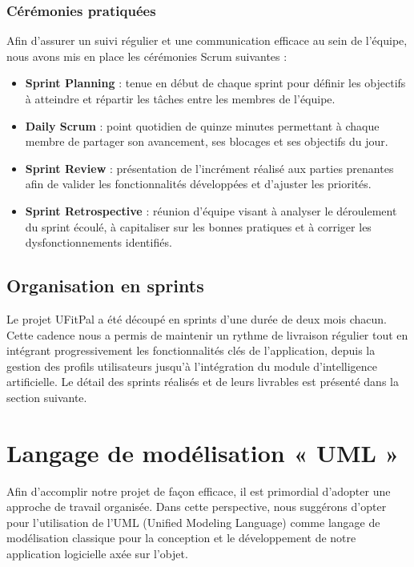 \documentclass[a4paper,12pt]{report}
\begin{document}
\subsubsection{Cérémonies pratiquées}
Afin d'assurer un suivi régulier et une communication efficace au sein de l'équipe, nous 
avons mis en place les cérémonies Scrum suivantes :
\begin{itemize}
    \item \textbf{Sprint Planning} : tenue en début de chaque sprint pour définir les 
    objectifs à atteindre et répartir les tâches entre les membres de l'équipe.
    \item \textbf{Daily Scrum} : point quotidien de quinze minutes permettant à chaque 
    membre de partager son avancement, ses blocages et ses objectifs du jour.
    \item \textbf{Sprint Review} : présentation de l'incrément réalisé aux parties 
    prenantes afin de valider les fonctionnalités développées et d'ajuster les priorités.
    \item \textbf{Sprint Retrospective} : réunion d'équipe visant à analyser le déroulement 
    du sprint écoulé, à capitaliser sur les bonnes pratiques et à corriger les 
    dysfonctionnements identifiés.
\end{itemize}

\subsection{Organisation en sprints}
Le projet UFitPal a été découpé en sprints d'une durée de deux mois chacun. Cette 
cadence nous a permis de maintenir un rythme de livraison régulier tout en intégrant 
progressivement les fonctionnalités clés de l'application, depuis la gestion des profils 
utilisateurs jusqu'à l'intégration du module d'intelligence artificielle. Le détail des 
sprints réalisés et de leurs livrables est présenté dans la section suivante.

\section{Langage de modélisation « UML »}

Afin d'accomplir notre projet de façon efficace, il est primordial d'adopter une approche de travail organisée. Dans cette perspective, nous suggérons d'opter pour l'utilisation de l'UML (Unified Modeling Language) comme langage de modélisation classique pour la conception et le développement de notre application logicielle axée sur l'objet.
\end{document}

